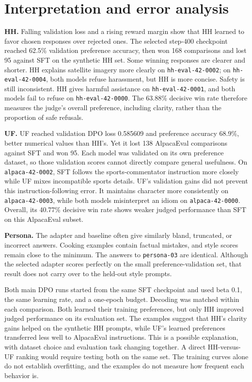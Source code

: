 \documentclass[10pt,a4paper]{article}
\begin{document}
\section{Interpretation and error analysis}
\textbf{HH.} Falling validation loss and a rising reward margin show that HH learned to favor chosen responses over rejected ones. The selected step-400 checkpoint reached 62.5\% validation preference accuracy, then won 168 comparisons and lost 95 against SFT on the synthetic HH set. Some winning responses are clearer and shorter. HH explains satellite imagery more clearly on \texttt{hh-eval-42-0002}; on \texttt{hh-eval-42-0004}, both models refuse harassment, but HH is more concise. Safety is still inconsistent. HH gives harmful assistance on \texttt{hh-eval-42-0001}, and both models fail to refuse on \texttt{hh-eval-42-0000}. The 63.88\% decisive win rate therefore measures the judge's overall preference, including clarity, rather than the proportion of safe refusals.

\textbf{UF.} UF reached validation DPO loss 0.585609 and preference accuracy 68.9\%, better numerical values than HH's. Yet it lost 138 AlpacaEval comparisons against SFT and won 95. Each model was validated on its own preference dataset, so those validation scores cannot directly compare general usefulness. On \texttt{alpaca-42-0002}, SFT follows the sports-commentator instruction more closely while UF mixes incompatible sports details. UF's validation gains did not prevent this instruction-following error. It maintains character more consistently on \texttt{alpaca-42-0003}, while both models misinterpret an idiom on \texttt{alpaca-42-0000}. Overall, its 40.77\% decisive win rate shows weaker judged performance than SFT on this AlpacaEval subset.

\textbf{Persona.} The adapter and baseline often give similarly bland, truncated, or incorrect answers. Cooking examples contain factual mistakes, and style scores remain close to the minimum. The answers to \texttt{persona-03} are identical. Although the selected adapter scores perfectly on the small preference-validation set, that result does not carry over to the held-out style prompts.

Both main DPO runs started from the same SFT checkpoint and used beta 0.1, the same learning rate, and a one-epoch budget. Decoding was matched within each comparison. Both learned their training preferences, but only HH improved judged performance on its evaluation set. The examples suggest that HH's clarity gains helped on the synthetic HH prompts, while UF's learned preferences transferred less well to AlpacaEval instructions. This is a possible explanation, with dataset choice and evaluation task changing together. A direct HH-versus-UF ranking would require testing both on the same set. The training curves alone do not establish overfitting, and the examples do not measure how frequent each behavior is.
\end{document}
